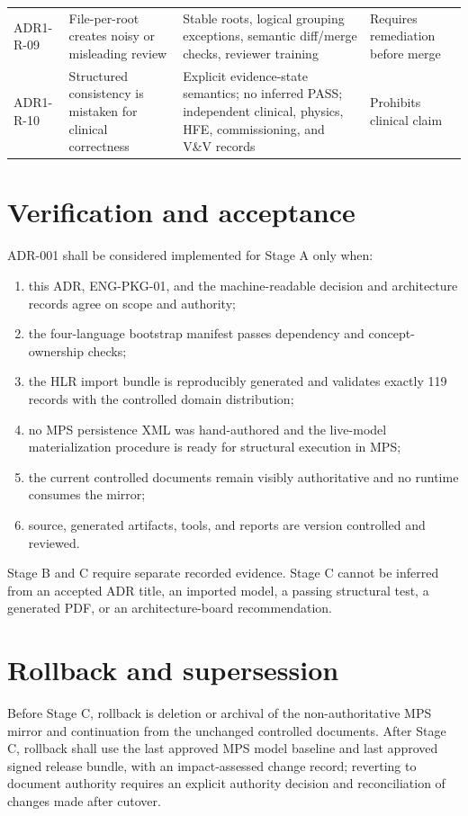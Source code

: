 \documentclass[11pt,letterpaper]{article}
\begin{document}
\begin{small}
\begin{longtable}{@{}L{0.13\textwidth}L{0.25\textwidth}L{0.34\textwidth}L{0.18\textwidth}@{}}
\addlinespace[2pt]
ADR1-R-09 & File-per-root creates noisy or misleading review & Stable roots, logical grouping exceptions, semantic diff/merge checks, reviewer training & Requires remediation before merge \\
\addlinespace[2pt]
ADR1-R-10 & Structured consistency is mistaken for clinical correctness & Explicit evidence-state semantics; no inferred PASS; independent clinical, physics, HFE, commissioning, and V\&V records & Prohibits clinical claim \\
\end{longtable}
\end{small}

\section{Verification and acceptance}

ADR-001 shall be considered implemented for Stage A only when:

\begin{enumerate}
\item this ADR, ENG-PKG-01, and the machine-readable decision and architecture records agree on scope and authority;
\item the four-language bootstrap manifest passes dependency and concept-ownership checks;
\item the HLR import bundle is reproducibly generated and validates exactly 119 records with the controlled domain distribution;
\item no MPS persistence XML was hand-authored and the live-model materialization procedure is ready for structural execution in MPS;
\item the current controlled documents remain visibly authoritative and no runtime consumes the mirror;
\item source, generated artifacts, tools, and reports are version controlled and reviewed.
\end{enumerate}

Stage B and C require separate recorded evidence. Stage C cannot be inferred from an accepted ADR title, an imported model, a passing structural test, a generated PDF, or an architecture-board recommendation.

\section{Rollback and supersession}

Before Stage C, rollback is deletion or archival of the non-authoritative MPS mirror and continuation from the unchanged controlled documents. After Stage C, rollback shall use the last approved MPS model baseline and last approved signed release bundle, with an impact-assessed change record; reverting to document authority requires an explicit authority decision and reconciliation of changes made after cutover.
\end{document}
